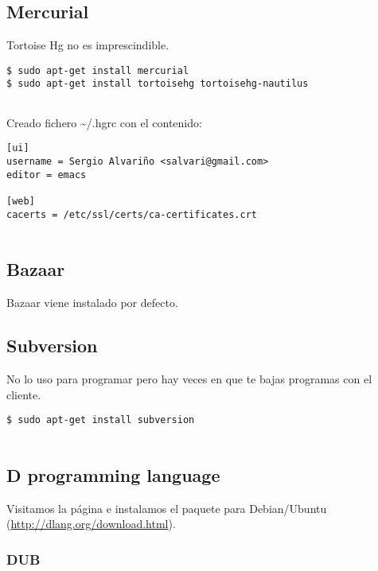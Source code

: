\subsection{Mercurial}\label{mercurial}

Tortoise Hg no es imprescindible.

\begin{verbatim}
$ sudo apt-get install mercurial
$ sudo apt-get install tortoisehg tortoisehg-nautilus
      
\end{verbatim}

Creado fichero \textasciitilde{}/.hgrc con el contenido:

\begin{verbatim}
[ui]
username = Sergio Alvariño <salvari@gmail.com>
editor = emacs

[web]
cacerts = /etc/ssl/certs/ca-certificates.crt
      
\end{verbatim}

\subsection{Bazaar}\label{bazaar}

Bazaar viene instalado por defecto.

\subsection{Subversion}\label{subversion}

No lo uso para programar pero hay veces en que te bajas programas con el
cliente.

\begin{verbatim}
$ sudo apt-get install subversion
      
\end{verbatim}

\subsection{D programming language}\label{d-programming-language}

Visitamos la página e instalamos el paquete para Debian/Ubuntu
(\url{http://dlang.org/download.html}).

\subsubsection{DUB}\label{dub}

